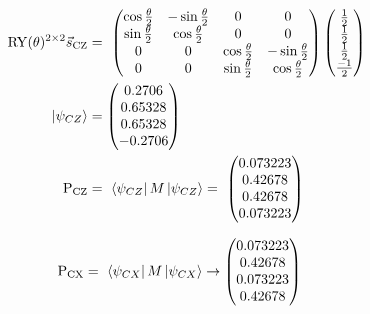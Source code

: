 \begin{equation}
    \centering
    \begin{split}
    \mathrm{RY}(\theta)^{2\times2}\vec{s}_{\mathrm{CZ}} &=\ \begin{pmatrix}
        \cos{\frac{\theta}{2}} & -\sin{\frac{\theta}{2}} & 0 & 0\\
        \sin{\frac{\theta}{2}} & \cos{\frac{\theta}{2}} & 0 & 0 \\
        0 & 0 & \cos{\frac{\theta}{2}} & -\sin{\frac{\theta}{2}}\\
        0 & 0 & \sin{\frac{\theta}{2}} & \cos{\frac{\theta}{2}}
    \end{pmatrix}\begin{pmatrix}
            \frac{1}{2}\\\frac{1}{2}\\\frac{1}{2}\\\frac{-1}{2}
        \end{pmatrix} \\
        \ket{\psi_{CZ}} &= \begin{pmatrix}
     0.2706\\
     0.65328\\
     0.65328\\
     -0.2706\\
     \end{pmatrix} \\
     \mathrm{P_{CZ}} &=\ \bra{\psi_{CZ}}M\ket{\psi_{CZ}} =\ \begin{pmatrix}
     0.073223\\
     0.42678\\
     0.42678\\
     0.073223\\
     \end{pmatrix}
    \end{split}
    \label{equation:cz_entanglement_with_ry}
\end{equation}

\begin{equation}
    \centering
    \begin{split}
         \mathrm{P_{CX}} &=\ \bra{\psi_{CX}}M\ket{\psi_{CX}} \rightarrow \begin{pmatrix}
         0.073223\\
         0.42678\\
         0.073223\\
         0.42678\\
     \end{pmatrix}
    \end{split}
    \label{equation:cx_entanglement_with_ry}
\end{equation}

